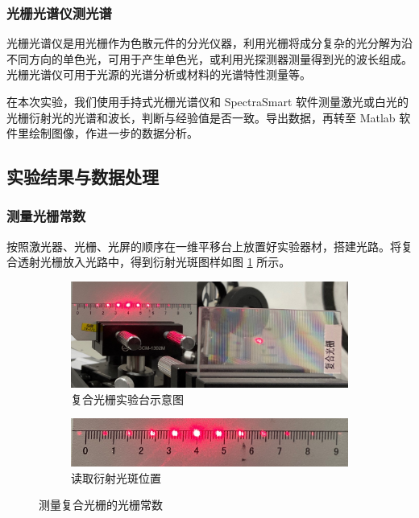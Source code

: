 \documentclass[UTF8]{article}
\theoremstyle{MyLineTheoremStyle} %
\theoremstyle{MyBlockTheoremStyle} %
\theoremstyle{MySubsubsectionStyle} %
\begin{document}
\subsubsection{光栅光谱仪测光谱}

光栅光谱仪是用光栅作为色散元件的分光仪器，利用光栅将成分复杂的光分解为沿不同方向的单色光，可用于产生单色光，或利用光探测器测量得到光的波长组成。光栅光谱仪可用于光源的光谱分析或材料的光谱特性测量等。

在本次实验，我们使用手持式光栅光谱仪和 SpectraSmart 软件测量激光或白光的光栅衍射光的光谱和波长，判断与经验值是否一致。导出数据，再转至 Matlab 软件里绘制图像，作进一步的数据分析。

\subsection{实验结果与数据处理}

\subsubsection{测量光栅常数}

按照激光器、光栅、光屏的顺序在一维平移台上放置好实验器材，搭建光路。将复合透射光栅放入光路中，得到衍射光斑图样如图 \ref{复合光栅实验} 所示。

\begin{figure}[H]\centering
\begin{subfigure}[b]{0.95\columnwidth}\centering
    \includegraphics[width=\columnwidth]{assets/4 衍射实验/复合光栅实验台搭建.jpg}
    \caption{复合光栅实验台示意图}
\end{subfigure}
\begin{subfigure}[b]{0.95\columnwidth}\centering
    \includegraphics[width=\columnwidth]{assets/4 衍射实验/复合光栅衍射点.jpg}
    \caption{读取衍射光斑位置}
\end{subfigure}
\caption{测量复合光栅的光栅常数}
\label{复合光栅实验}
\end{figure}
\end{document}
